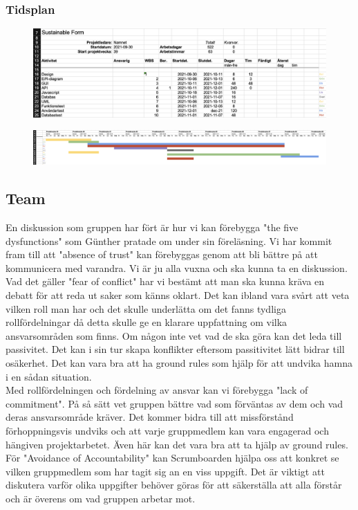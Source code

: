 \documentclass{article}
\begin{document}
\newpage
\subsubsection{Tidsplan}

\begin{figure}[htp]
    \centering
    \includegraphics[width = 450px]{grant1.png}
    \label{fig:24}
\end{figure}

\begin{figure}[htp]
    \centering
    \includegraphics[width = 450px]{Grant2.png}
    \label{fig:24}
\end{figure}

\subsection{Team}
En diskussion som gruppen har fört är hur vi kan förebygga "the five dysfunctions" som Günther pratade om under sin föreläsning. Vi har
kommit fram till att "absence of trust" kan förebyggas genom att bli bättre på att kommunicera med varandra. Vi är ju alla vuxna och ska kunna ta en diskussion. Vad det gäller "fear of conflict" har vi
bestämt att man ska kunna kräva en debatt för att reda ut saker som känns oklart. Det kan ibland
vara svårt att veta vilken roll man har och det skulle underlätta om det fanns tydliga
rollfördelningar då detta skulle ge en klarare uppfattning om vilka ansvarsområden som finns. Om någon inte vet vad de ska
göra kan det leda till passivitet. Det kan i sin tur skapa konflikter eftersom passitivitet lätt bidrar till osäkerhet. Det kan vara bra att ha ground rules som hjälp för att undvika hamna i en
sådan situation. \\
Med rollfördelningen och fördelning av ansvar kan vi förebygga "lack of
commitment". På så sätt vet gruppen bättre vad som förväntas av dem och vad deras ansvarsområde kräver. Det kommer bidra till att missförstånd förhoppningsvis undviks och att
varje gruppmedlem kan vara engagerad och hängiven projektarbetet. Även här kan det vara bra
att ta hjälp av ground rules. För "Avoidance of Accountability" kan Scrumboarden hjälpa oss att
konkret se vilken gruppmedlem som har tagit sig an en viss uppgift. Det är viktigt att diskutera
varför olika uppgifter behöver göras för att säkerställa att alla förstår och är överens om vad
gruppen arbetar mot.
\end{document}
